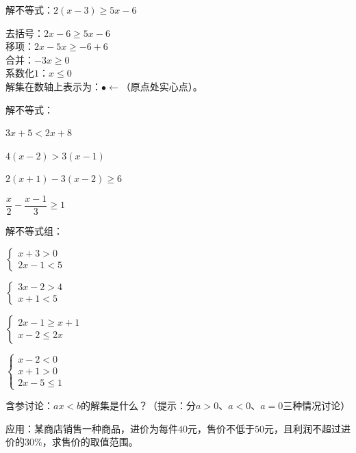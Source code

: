 \documentclass[a4paper,12pt]{ctexart}
\begin{document}

\begin{example}
解不等式：$2(x-3)\ge5x-6$
\end{example}
\begin{solution}
去括号：$2x-6\ge5x-6$\\
移项：$2x-5x\ge-6+6$\\
合并：$-3x\ge0$\\
系数化$1$：$x\le0$\\
解集在数轴上表示为：$\bullet\leftarrow$（原点处实心点）。
\end{solution}




\begin{exercise}
\item 解不等式：
  \begin{subexercise}
    \item $3x+5<2x+8$
    \item $4(x-2)>3(x-1)$
    \item $2(x+1)-3(x-2)\ge6$
    \item $\dfrac{x}{2}-\dfrac{x-1}{3}\ge1$
  \end{subexercise}

\item 解不等式组：
  \begin{subexercise}
    \item $\begin{cases}x+3>0\\2x-1<5\end{cases}$
    \item $\begin{cases}3x-2>4\\x+1<5\end{cases}$
    \item $\begin{cases}2x-1\ge x+1\\x-2\le 2x\end{cases}$
    \item $\begin{cases}x-2<0\\x+1>0\\2x-5\le1\end{cases}$
  \end{subexercise}

\item 含参讨论：$ax<b$的解集是什么？（提示：分$a>0$、$a<0$、$a=0$三种情况讨论）

\item 应用：某商店销售一种商品，进价为每件$40$元，售价不低于$50$元，且利润不超过进价的$30\%$，求售价的取值范围。
\end{exercise}
\end{document}

